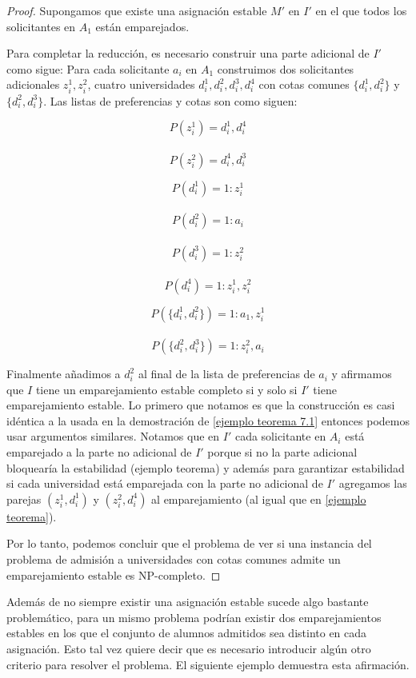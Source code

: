 \begin{proof}
Supongamos que existe una asignación estable $M'$ en $I'$ en el que todos los solicitantes en $A_1$ están emparejados.


Para completar la reducción, es necesario construir una parte adicional de $I'$ como sigue: Para cada solicitante $a_i$ en $A_1$ construimos dos solicitantes adicionales $z_i^1,z_i^2$, cuatro universidades $d_i^1,d_i^2,d_i^3,d_i^4$ con cotas comunes $\{d_i^1,d_i^2\}$ y $\{d_i^2,d_i^3\}$. Las listas de preferencias y cotas son como siguen:
\noindent \begin{minipage}{.3\linewidth}
$$P(z_i^1)=d_i^1,d_i^4$$ \\
$$P(z_i^2)=d_i^4,d_i^3$$ 
\end{minipage}%
\begin{minipage}{.3\linewidth}
$$P(d_i^1)=1:z_i^1$$ \\
$$P(d_i^2)=1:a_i$$ \\
$$P(d_i^3)=1: z_i^2$$ \\
$$P(d_i^4)=1: z_i^1,z_i^2$$ 
\end{minipage}
\begin{minipage}{.4\linewidth}
$$P(\{d_i^1,d_i^2\})= 1:a_1,z_i^1$$ \\
$$P(\{d_i^2,d_i^3\})=1:z_i^2,a_i$$
\end{minipage}
\medskip

Finalmente añadimos a $d_i^2$ al final de la lista de preferencias de $a_i$ y afirmamos que $I$ tiene un emparejamiento estable completo si y solo si $I'$ tiene emparejamiento estable. Lo primero que notamos es que la construcción es casi idéntica a la usada en la demostración de \ref{ejemplo teorema 7.1} entonces podemos usar argumentos similares. Notamos que en $I'$ cada solicitante en $A_i$ está emparejado a la parte no adicional de $I'$ porque si no la parte adicional bloquearía la estabilidad ({ejemplo teorema}) y además para garantizar estabilidad si cada universidad está emparejada con la parte no adicional de $I'$ agregamos las parejas $(z_i^1,d_i^1)$ y $(z_i^2,d_i^4)$ al emparejamiento (al igual que en \ref{ejemplo teorema}).

Por lo tanto, podemos concluir que el problema de ver si una instancia del problema de admisión a universidades con cotas comunes admite un emparejamiento estable es NP-completo.

\end{proof}

Además de no siempre existir una asignación estable sucede algo bastante problemático, para un mismo problema podrían existir dos emparejamientos estables en los que el conjunto de alumnos admitidos sea distinto en cada asignación. Esto tal vez quiere decir que es necesario introducir algún otro criterio para resolver el problema. El siguiente ejemplo demuestra esta afirmación. 

